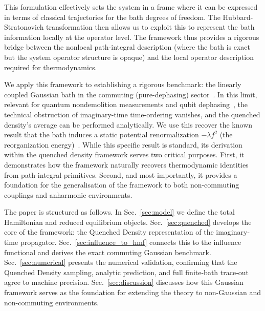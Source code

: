 This formulation effectively sets the system in a frame where it can be expressed in terms of classical trajectories for the bath degrees of freedom. The Hubbard-Stratonovich transformation then allows us to exploit this to represent the bath information locally at the operator level. The framework thus provides a rigorous bridge between the nonlocal path-integral description (where the bath is exact but the system operator structure is opaque) and the local operator description required for thermodynamics.

We apply this framework to establishing a rigorous benchmark: the linearly coupled Gaussian bath in the commuting (pure-dephasing) sector~\cite{clerkIntroductionQuantumNoise2010,breuerTheoryOpenQuantum2002}. In this limit, relevant for quantum nondemolition measurements and qubit dephasing~\cite{makhlinQuantumStateEngineering2001,palmaQuantumComputersDissipation1996}, the technical obstruction of imaginary-time time-ordering vanishes, and the quenched density's average can be performed analytically. We use this recover the known result that the bath induces a static potential renormalization $-\lambda f^2$ (the reorganization energy)~\cite{campisiTalknerHanggi2009Solvable}. While this specific result is standard, its derivation within the quenched density framework serves two critical purposes. First, it demonstrates how the framework naturally recovers thermodynamic identities from path-integral primitives. Second, and most importantly, it provides a foundation for the generalisation of the framework to both non-commuting couplings and anharmonic environments.

The paper is structured as follows. In Sec.~\ref{sec:model} we define the total Hamiltonian and reduced equilibrium objects. Sec.~\ref{sec:quenched} develops the core of the framework: the Quenched Density representation of the imaginary-time propagator. Sec.~\ref{sec:influence_to_hmf} connects this to the influence functional and derives the exact commuting Gaussian benchmark. Sec.~\ref{sec:numerical} presents the numerical validation, confirming that the Quenched Density sampling, analytic prediction, and full finite-bath trace-out agree to machine precision. Sec.~\ref{sec:discussion} discusses how this Gaussian framework serves as the foundation for extending the theory to non-Gaussian and non-commuting environments.
